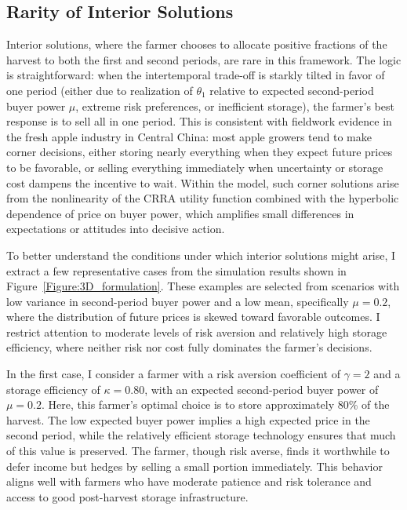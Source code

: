 \subsection{Rarity of Interior Solutions}
Interior solutions, where the farmer chooses to allocate positive fractions of the harvest to both the first and second periods, are rare in this framework. The logic is straightforward: when the intertemporal trade-off is starkly tilted in favor of one period (either due to realization of $\theta_1$ relative to expected second-period buyer power $\mu$, extreme risk preferences, or inefficient storage), the farmer's best response is to sell all in one period. This is consistent with fieldwork evidence in the fresh apple industry in Central China: most apple growers tend to make corner decisions, either storing nearly everything when they expect future prices to be favorable, or selling everything immediately when uncertainty or storage cost dampens the incentive to wait. Within the model, such corner solutions arise from the nonlinearity of the CRRA utility function combined with the hyperbolic dependence of price on buyer power, which amplifies small differences in expectations or attitudes into decisive action.

To better understand the conditions under which interior solutions might arise, I extract a few representative cases from the simulation results shown in Figure~\ref{Figure:3D_formulation}. These examples are selected from scenarios with low variance in second-period buyer power and a low mean, specifically $\mu = 0.2$, where the distribution of future prices is skewed toward favorable outcomes. I restrict attention to moderate levels of risk aversion and relatively high storage efficiency, where neither risk nor cost fully dominates the farmer's decisions.

In the first case, I consider a farmer with a risk aversion coefficient of $\gamma = 2$ and a storage efficiency of $\kappa = 0.80$, with an expected second-period buyer power of $\mu = 0.2$. Here, this farmer's optimal choice is to store approximately 80\% of the harvest. The low expected buyer power implies a high expected price in the second period, while the relatively efficient storage technology ensures that much of this value is preserved. The farmer, though risk averse, finds it worthwhile to defer income but hedges by selling a small portion immediately. This behavior aligns well with farmers who have moderate patience and risk tolerance and access to good post-harvest storage infrastructure.

